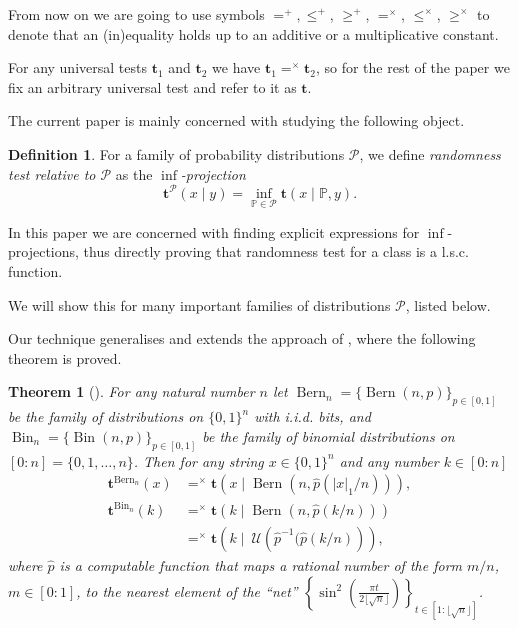 \documentclass{article}
\newtheorem{theorem}{Theorem}
\theoremstyle{definition}
\theoremstyle{definition}
\newtheorem{definition}{Definition}[section]
\newcommand{\probP}{\mathbb{P}}
\newcommand{\uut}{\mathbf{t}}
\begin{document}
From now on we are going to use symbols $=^+, \le^+$, $\ge^+$, $=^\times$, $\le^\times$, $\ge^\times$ to denote that an (in)equality holds up to an additive or a multiplicative constant.

For any universal tests $\uut_1$ and $\uut_2$ we have $\uut_1=^\times \uut_2$, so for the rest of the paper we fix an arbitrary universal test and refer to it as $\uut$.

The current paper is mainly concerned with studying the following object.

\begin{definition}
    For a family of probability distributions $\mathcal{P}$, we define \emph{randomness test relative to $\mathcal{P}$} as the \emph{$\inf$-projection}
    \[
        \uut^{\mathcal{P}}(x\mid y) = \inf_{\probP\in\mathcal{P}}\uut(x\mid \probP, y).
    \]
\end{definition}




In this paper we are concerned with finding explicit expressions for $\inf$-projections, thus directly proving that randomness test for a class is a l.s.c. function.

We will show this for many important families of distributions $\mathcal{P}$, listed below.

Our technique generalises and extends the approach of \cite{VovkLearningBernoulli199796, vovk2016concept}, where the following theorem is proved.

\begin{theorem}[\cite{VovkLearningBernoulli199796, vovk2016concept}]\label{thm:vovk-bern}
    For any natural number $n$ let $\operatorname{Bern}_n=\{\operatorname{Bern}(n,p)\}_{p\in[0,1]}$ be the family of distributions on $\{0,1\}^n$ with i.i.d. bits, and $\operatorname{Bin}_n = \{\operatorname{Bin}(n,p)\}_{p\in [0,1]}$ be the family of binomial distributions on $[0:n]=\{0,1,\ldots,n\}$. Then for any string $x \in \{0,1\}^n$ and any number $k \in [0:n]$
    \begin{align*}
        \uut^{\operatorname{Bern}_n}(x) &=^\times \uut(x\mid \operatorname{Bern}(n,\hat p(|x|_1/n))),\\
        \uut^{\operatorname{Bin}_n}(k) &=^\times 
        \uut(k\mid \operatorname{Bern}(n,\hat p(k/n)))\\
        &=^\times
        \uut\left(k \mid \ \mathcal{U}\left(\hat p^{-1} (\hat p(k/n)\right)\right),
    \end{align*}
    where $\hat p$ is a computable function that maps a rational number of the form $m/n$, ${m \in [0:1]}$, to the nearest element of the ``net'' ${\left\{ \sin^2 \left( \frac{\pi t}{2\lfloor \sqrt{n}\rfloor}\right) \right\}_{t\in [1:\lfloor\sqrt{n}\rfloor]}}$.
\end{theorem}
\end{document}
